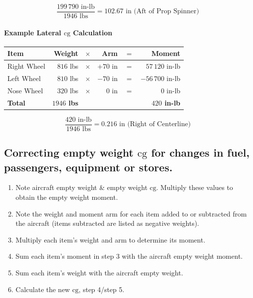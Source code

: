 \documentclass[
]{book}
\providecommand{\tightlist}{%
  \setlength{\itemsep}{0pt}\setlength{\parskip}{0pt}}
\begin{document}
\[\frac{199\,790 \text{ in-lb}}{1946 \text{ lbs}} = 102.67 \text{ in (Aft of Prop Spinner)} \]

\hypertarget{example-lateral-mathrmcg-calculation}{%
\paragraph*{\texorpdfstring{Example Lateral \(\mathrm{cg}\) Calculation}{Example Lateral \textbackslash mathrm\{cg\} Calculation}}\label{example-lateral-mathrmcg-calculation}}

\begin{longtable}[]{@{}lrrrrr@{}}
\toprule
Item & Weight & \(\times\) & Arm & \(=\) & Moment\tabularnewline
\midrule
\endhead
Right Wheel & \(816\) lbs & \(\times\) & \(+70\) in & \(=\) & \(57\,120\) in-lb\tabularnewline
Left Wheel & \(810\) lbs & \(\times\) & \(-70\) in & \(=\) & \(-56\,700\) in-lb\tabularnewline
Nose Wheel & \(320\) lbs & \(\times\) & \(0\) in & \(=\) & \(0\) in-lb\tabularnewline
\textbf{Total} & \textbf{\(1946\) lbs} & & & & \textbf{\(420\) in-lb}\tabularnewline
\bottomrule
\end{longtable}

\[\frac{420 \text{ in-lb}}{1946 \text{ lbs}} = 0.216 \text{ in (Right of Centerline)} \]

\hypertarget{correcting-empty-weight-mathrmcg-for-changes-in-fuel-passengers-equipment-or-stores.}{%
\subsection*{\texorpdfstring{Correcting empty weight \(\mathrm{cg}\) for changes in fuel, passengers, equipment or stores.}{Correcting empty weight \textbackslash mathrm\{cg\} for changes in fuel, passengers, equipment or stores.}}\label{correcting-empty-weight-mathrmcg-for-changes-in-fuel-passengers-equipment-or-stores.}}

\begin{enumerate}
\def\labelenumi{\arabic{enumi}.}
\tightlist
\item
  Note aircraft empty weight \& empty weight \(\mathrm{cg}\). Multiply these values to obtain the empty weight moment.
\item
  Note the weight and moment arm for each item added to or subtracted from the aircraft (items subtracted are listed as negative weights).
\item
  Multiply each item's weight and arm to determine its moment.
\item
  Sum each item's moment in step 3 with the aircraft empty weight moment.
\item
  Sum each item's weight with the aircraft empty weight.
\item
  Calculate the new \(\mathrm{cg}\), step 4/step 5.
\end{enumerate}
\end{document}
